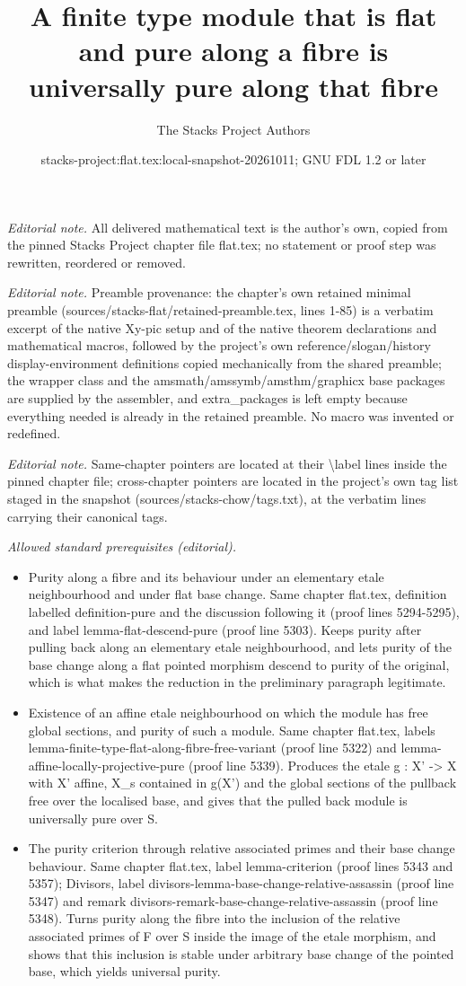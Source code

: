 \documentclass[10pt,a4paper]{amsart}
\title{A finite type module that is flat and pure along a fibre is universally pure along that fibre}
\author{The Stacks Project Authors}
\date{stacks-project:flat.tex:local-snapshot-20261011; GNU FDL 1.2 or later}
\theoremstyle{plain}
\theoremstyle{definition}
\theoremstyle{remark}
\numberwithin{equation}{subsection}
\begin{document}
\maketitle
\noindent\textit{Editorial note.} All delivered mathematical text is the author's own, copied from the pinned Stacks Project chapter file flat.tex; no statement or proof step was rewritten, reordered or removed.\par\medskip
\noindent\textit{Editorial note.} Preamble provenance: the chapter's own retained minimal preamble (sources/stacks-flat/retained-preamble.tex, lines 1-85) is a verbatim excerpt of the native Xy-pic setup and of the native theorem declarations and mathematical macros, followed by the project's own reference/slogan/history display-environment definitions copied mechanically from the shared preamble; the wrapper class and the amsmath/amssymb/amsthm/graphicx base packages are supplied by the assembler, and extra\_packages is left empty because everything needed is already in the retained preamble. No macro was invented or redefined.\par\medskip
\noindent\textit{Editorial note.} Same-chapter pointers are located at their \textbackslash{}label lines inside the pinned chapter file; cross-chapter pointers are located in the project's own tag list staged in the snapshot (sources/stacks-chow/tags.txt), at the verbatim lines carrying their canonical tags.\par\medskip
\noindent\textit{Allowed standard prerequisites (editorial).}\begin{itemize}
\item Purity along a fibre and its behaviour under an elementary etale neighbourhood and under flat base change. Same chapter flat.tex, definition labelled definition-pure and the discussion following it (proof lines 5294-5295), and label lemma-flat-descend-pure (proof line 5303). Keeps purity after pulling back along an elementary etale neighbourhood, and lets purity of the base change along a flat pointed morphism descend to purity of the original, which is what makes the reduction in the preliminary paragraph legitimate.
\item Existence of an affine etale neighbourhood on which the module has free global sections, and purity of such a module. Same chapter flat.tex, labels lemma-finite-type-flat-along-fibre-free-variant (proof line 5322) and lemma-affine-locally-projective-pure (proof line 5339). Produces the etale g : X' -> X with X' affine, X\_s contained in g(X') and the global sections of the pullback free over the localised base, and gives that the pulled back module is universally pure over S.
\item The purity criterion through relative associated primes and their base change behaviour. Same chapter flat.tex, label lemma-criterion (proof lines 5343 and 5357); Divisors, label divisors-lemma-base-change-relative-assassin (proof line 5347) and remark divisors-remark-base-change-relative-assassin (proof line 5348). Turns purity along the fibre into the inclusion of the relative associated primes of F over S inside the image of the etale morphism, and shows that this inclusion is stable under arbitrary base change of the pointed base, which yields universal purity.
\end{itemize}\medskip
\end{document}

